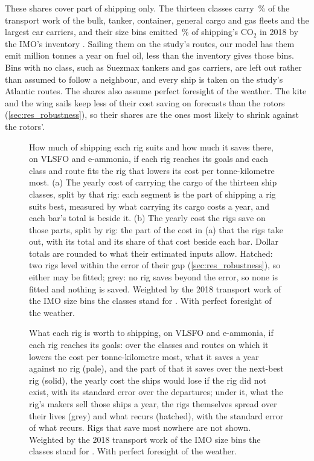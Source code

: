 These shares cover part of shipping only. The thirteen classes carry \NumFleetWorkShare\,\% of the transport work of the bulk, tanker, container, general cargo and gas fleets and the largest car carriers, and their size bins emitted \NumFleetFuelShare\,\% of shipping's CO$_2$ in 2018 by the IMO's inventory \citep{faber2020}. Sailing them on the study's routes, our model has them emit \NumFleetEmittedOil{} million tonnes a year on fuel oil, less than the inventory gives those bins. Bins with no class, such as Suezmax tankers and gas carriers, are left out rather than assumed to follow a neighbour, and every ship is taken on the study's Atlantic routes. The shares also assume perfect foresight of the weather. The kite and the wing sails keep less of their cost saving on forecasts than the rotors (\cref{sec:res_robustness}), so their shares are the ones most likely to shrink against the rotors'.

\begin{figure}[tbp]
\centering
{}
\caption{How much of shipping each rig suits and how much it saves there, on VLSFO and e-ammonia, if each rig reaches its goals and each class and route fits the rig that lowers its cost per tonne-kilometre most. (a) The yearly cost of carrying the cargo of the thirteen ship classes, split by that rig: each segment is the part of shipping a rig suits best, measured by what carrying its cargo costs a year, and each bar's total is beside it. (b) The yearly cost the rigs save on those parts, split by rig: the part of the cost in (a) that the rigs take out, with its total and its share of that cost beside each bar. Dollar totals are rounded to what their estimated inputs allow. Hatched: two rigs level within the error of their gap (\cref{sec:res_robustness}), so either may be fitted; grey: no rig saves beyond the error, so none is fitted and nothing is saved. Weighted by the 2018 transport work of the IMO size bins the classes stand for \citep{faber2020}. With perfect foresight of the weather.}
\label{fig:fleet_share}
\end{figure}

\begin{figure}[tbp]
\centering
{}
\caption{ What each rig is worth to shipping, on VLSFO and e-ammonia, if each rig reaches its goals: over the classes and routes on which it lowers the cost per tonne-kilometre most, what it saves a year against no rig (pale), and the part of that it saves over the next-best rig (solid), the yearly cost the ships would lose if the rig did not exist, with its standard error over the departures; under it, what the rig's makers sell those ships a year, the rigs themselves spread over their lives (grey) and what recurs (hatched), with the standard error of what recurs. Rigs that save most nowhere are not shown. Weighted by the 2018 transport work of the IMO size bins the classes stand for \citep{faber2020}. With perfect foresight of the weather.}
\label{fig:fleet_margin}
\end{figure}


